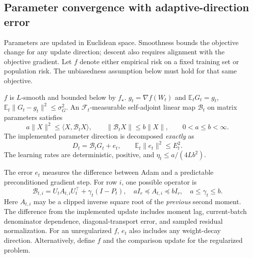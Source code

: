 \subsection{Parameter convergence with adaptive-direction error}
\label{app:convergence}

Parameters are updated in Euclidean space. Smoothness bounds the objective
change for any update direction; descent also requires alignment with the
objective gradient. Let $f$ denote either empirical risk on a fixed
training set or population risk. The unbiasedness assumption below must
hold for that same objective.

\begin{assumption}
\label{ass:parameter}
$f$ is $L$-smooth and bounded below by $f_\star$.
$g_t=\nabla f(W_t)$ and
$\mathbb E_tG_t=g_t$,
$\mathbb E_t\|G_t-g_t\|^2\le\sigma_G^2$.
An $\mathcal F_t$-measurable self-adjoint linear map
$\mathcal B_t$ on matrix parameters satisfies
\begin{equation}
 a\|X\|^2\le\langle X,\mathcal B_tX\rangle,
 \qquad\|\mathcal B_tX\|\le b\|X\|,
 \qquad 0<a\le b<\infty.\label{eq:metric-bounds}
\end{equation}
The implemented parameter direction is decomposed \emph{exactly} as
\begin{equation}
 D_t=\mathcal B_tG_t+e_t,\qquad
 \mathbb E_t\|e_t\|^2\le E_t^2.\label{eq:parameter-defect}
\end{equation}
The learning rates are deterministic, positive, and
$\eta_t\le a/(4Lb^2)$.
\end{assumption}

The error $e_t$ measures the difference between Adam and a predictable
preconditioned gradient step. For row $i$, one possible operator is
\begin{equation}
 \mathcal B_{t,i}=U_t A_{t,i}U_t^\top+\gamma_t(I-P_t),
 \quad aI_r\preceq A_{t,i}\preceq bI_r,
 \quad a\le\gamma_t\le b.\label{eq:routed-metric}
\end{equation}
Here $A_{t,i}$ may be a clipped inverse square root of the \emph{previous}
second moment. The difference from the implemented update includes moment
lag, current-batch denominator dependence, diagonal-transport error, and
sampled residual normalization. For an unregularized $f$, $e_t$ also
includes any weight-decay direction. Alternatively, define $f$ and the
comparison update for the regularized problem.

